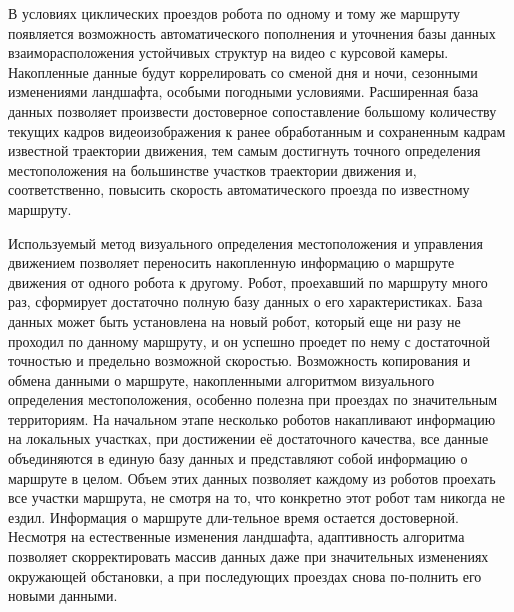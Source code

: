 В условиях циклических проездов робота по одному и тому же маршруту появляется возможность автоматического пополнения и уточнения базы данных взаиморасположения устойчивых структур на видео с курсовой камеры. Накопленные данные будут коррелировать со сменой дня и ночи, сезонными изменениями ландшафта, особыми погодными условиями. Расширенная база данных позволяет произвести достоверное сопоставление большому количеству текущих кадров видеоизображения к ранее обработанным и сохраненным кадрам известной траектории движения, тем самым достигнуть точного определения местоположения на большинстве участков траектории движения и, соответственно, повысить скорость автоматического проезда по известному маршруту.

Используемый метод визуального определения местоположения и управления движением позволяет переносить накопленную информацию о маршруте движения от одного робота к другому. Робот, проехавший по маршруту много раз, сформирует достаточно полную базу данных о его характеристиках. База данных может быть установлена на новый робот, который еще ни разу не проходил по данному маршруту, и он успешно проедет по нему с достаточной точностью и предельно возможной скоростью. Возможность копирования и обмена данными о маршруте, накопленными алгоритмом визуального определения местоположения, особенно полезна при проездах по значительным территориям. На начальном этапе несколько роботов накапливают информацию на локальных участках, при достижении её достаточного качества, все данные объединяются в единую базу данных и представляют собой информацию о маршруте в целом. 
Объем этих данных позволяет каждому из роботов проехать все участки маршрута, не смотря на то, что конкретно этот робот там никогда не ездил. Информация о маршруте дли-тельное время остается достоверной. Несмотря на естественные изменения ландшафта, адаптивность алгоритма позволяет скорректировать массив данных даже при значительных изменениях окружающей обстановки, а при последующих проездах снова по-полнить его новыми данными.

